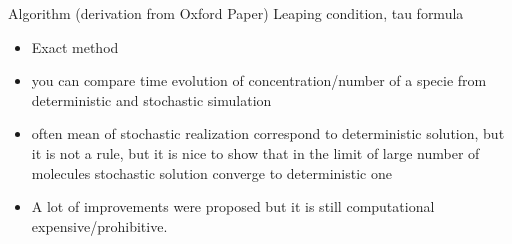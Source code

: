 \ifdebug
Algorithm (derivation from Oxford Paper)
Leaping condition, tau formula\cite{cao_adaptive_2007}
\begin{itemize}
\item Exact method
\item you can compare time evolution of concentration/number of a specie from deterministic and stochastic simulation 
\item often mean of stochastic realization correspond to deterministic solution, but it is not a rule, but it is nice to show that in the limit of large number of molecules stochastic solution converge to deterministic one
\item A lot of improvements were proposed but it is still computational expensive/prohibitive. 
\end{itemize}
\fi